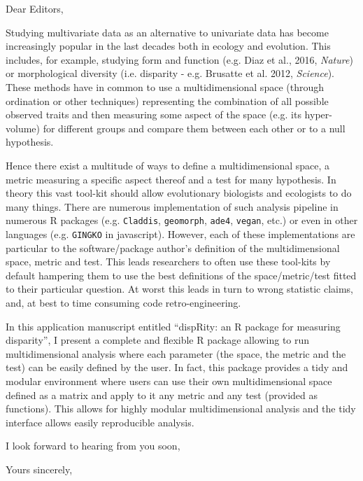\documentclass[11pt]{letter}
\begin{document}
\begin{letter}{}
\opening{Dear Editors,}

Studying multivariate data as an alternative to univariate data has become increasingly popular in the last decades both in ecology and evolution.
This includes, for example, studying form and function (e.g. Diaz et al., 2016, \textit{Nature}) or morphological diversity (i.e. disparity - e.g. Brusatte et al. 2012, \textit{Science}).
These methods have in common to use a multidimensional space (through ordination or other techniques) representing the combination of all possible observed traits and then measuring some aspect of the space (e.g. its hyper-volume) for different groups and compare them between each other or to a null hypothesis.

Hence there exist a multitude of ways to define a multidimensional space, a metric measuring a specific aspect thereof and a test for many hypothesis.
In theory this vast tool-kit should allow evolutionary biologists and ecologists to do many things.
There are numerous implementation of such analysis pipeline in numerous R packages (e.g. \texttt{Claddis}, \texttt{geomorph}, \texttt{ade4}, \texttt{vegan}, etc.) or even in other languages (e.g. \texttt{GINGKO} in javascript).
However, each of these implementations are particular to the software/package author's definition of the multidimensional space, metric and test.
This leads researchers to often use these tool-kits by default hampering them to use the best definitions of the space/metric/test fitted to their particular question.
At worst this leads in turn to wrong statistic claims, and, at best to time consuming code retro-engineering.

In this application manuscript entitled ``dispRity: an R package for measuring disparity'', I present a complete and flexible R package allowing to run multidimensional analysis where each parameter (the space, the metric and the test) can be easily defined by the user.
In fact, this package provides a tidy and modular environment where users can use their own multidimensional space defined as a matrix and apply to it any metric and any test (provided as functions).
This allows for highly modular multidimensional analysis and the tidy interface allows easily reproducible analysis.

I look forward to hearing from you soon,

\closing{Yours sincerely,}

\end{letter}
\end{document}
